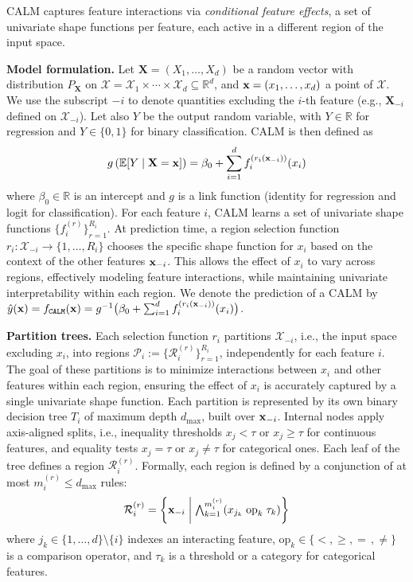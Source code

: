 CALM captures feature interactions via \emph{conditional feature effects}, a set of univariate shape functions per feature, 
each active in a different region of the input space.

\label{subsec:model-overview}

\textbf{Model formulation.}
Let $\mathbf{X}=(X_1,\ldots,X_d)$ be a random vector with distribution $P_{\mathbf{X}}$ on $\mathcal{X}=\mathcal{X}_1 \times \cdots \times \mathcal{X}_d\subseteq\mathbb{R}^d$, and $\mathbf{x}=(x_1,\ldots,x_d)$ a point of $\mathcal{X}$.
We use the subscript $-i$ to denote quantities excluding the $i$-th feature (e.g., $\mathbf{X}_{-i}$ defined on $\mathcal{X}_{-i}$). Let also $Y$ be the output random variable, with $Y\in\mathbb{R}$ for regression and $Y\in\{0,1\}$ for binary classification.
CALM is then defined as
\begin{equation}
    \label{eq:CALM}
    g \left ( \mathbb{E}[Y \mid \mathbf{X}=\mathbf{x} ] \right ) = \beta_0 + \sum_{i=1}^d f_i^{(r_i(\mathbf{x}_{-i}))}(x_i)
\end{equation}
where 
\( \beta_0 \in \mathbb{R} \) is an intercept and
\( g \) is a link function (identity for regression and logit for classification).
For each feature $i$, CALM learns a set of univariate shape functions \( \{ f_i^{(r)} \}_{r=1}^{R_i} \).
At prediction time, a region selection function $r_i: \mathcal{X}_{-i} \to \{1, \ldots, R_i\}$ chooses the specific shape function for $x_i$ based on the context of the other features $\mathbf{x}_{-i}$.
This allows the effect of $x_i$ to vary across regions, effectively modeling feature interactions, while maintaining univariate interpretability within each region.
We denote the prediction of a CALM by $\hat y(\mathbf{x})=f_{\texttt{CALM}}(\mathbf{x})=g^{-1}\big(\beta_0+\sum_{i=1}^d f_i^{(r_i(\mathbf{x}_{-i}))}(x_i)\big)$.

\textbf{Partition trees.}
Each selection function \( r_i \) partitions $\mathcal{X}_{-i}$, i.e., the input space excluding $x_i$, into regions $\mathcal{P}_i := \{\mathcal{R}_i^{(r)}\}_{r=1}^{R_i}$, independently for each feature $i$.
The goal of these partitions is to minimize interactions between $x_i$ and other features within each region, ensuring the effect of $x_i$ is accurately captured by a single univariate shape function.
Each partition is represented by its own binary decision tree $T_i$ of maximum depth $d_{\max}$, built over $\mathbf{x}_{-i}$. 
Internal nodes apply axis-aligned splits, i.e., inequality thresholds \(x_j < \tau\) or $x_j \geq \tau$ for continuous features, and equality tests \( x_j = \tau \) or \(x_j \neq \tau\) for categorical ones. 
Each leaf of the tree defines a region \(\mathcal{R}_i^{(r)}\).
Formally, each region is defined by a conjunction of at most $m_i^{(r)} \leq d_{\max}$ rules:
\begin{equation}
\label{eq:region-definition}
\mathcal{R}_i^{(r)} = \left\{ \mathbf{x}_{-i}  \;\middle|\; \textstyle\bigwedge_{k=1}^{m_i^{(r)}} (x_{j_k} \;\text{op}_k\; \tau_k)  \right\}
\end{equation}
where 
\( j_k \in \{1, \dots, d\} \setminus \{i\} \) indexes an interacting feature, 
\( \text{op}_k \in \{<, \geq, =\,, \ne\} \) is a comparison operator,
and
 \( \tau_k \) is a threshold or a category for categorical features.

